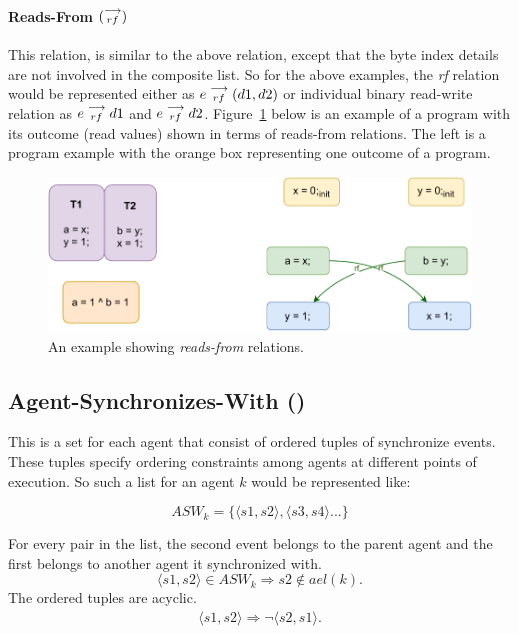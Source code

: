             \paragraph{Reads-From $(\stackrel{\longrightarrow}{_{rf}})$}
            This relation, is similar to the above relation, except that the byte index details are not involved in the composite list. 
            So for the above examples, the \textit{rf} relation would be represented either as   
                $e\stackrel{\longrightarrow}{_{rf}}(d1, d2)$
            or individual binary read-write relation as 
                $e\stackrel{\longrightarrow}{_{rf}}d1$ and $e\stackrel{\longrightarrow}{_{rf}}d2$.
            Figure~\ref{model:read-from} below is an example of a program with its outcome (read values) shown in terms of reads-from relations.
            The left is a program example with the orange box representing one outcome of a program. 
            \begin{figure}[H]
                \centering
                \includegraphics[scale=0.7]{3.ECMAScriptMemoryModel/ReadsFrom.pdf}
                \caption{An example showing \textit{reads-from} relations.}
                \label{model:read-from}
            \end{figure}
            
        \subsection{Agent-Synchronizes-With ()}
            This is a set for each agent that consist of ordered tuples of synchronize events. 
            These tuples specify ordering constraints among agents at different points of execution. 
            So such a list for an agent $k$ would be represented like:  

                \[ASW_k = \{ \langle s1, s2 \rangle, \langle s3, s4 \rangle ...\}\]
        
            For every pair in the list, the second event belongs to the parent agent and the first belongs to another agent it synchronized with\footnotemark.
                \[  
                    \langle s1, s2 \rangle \in ASW_k 
                    \Rightarrow{} 
                    s2 \notin ael(k).                        
                \]
            The ordered tuples are acyclic.
            \begin{align*}
                \langle s1, s2 \rangle \Rightarrow \neg \langle s2, s1 \rangle.
            \end{align*}

